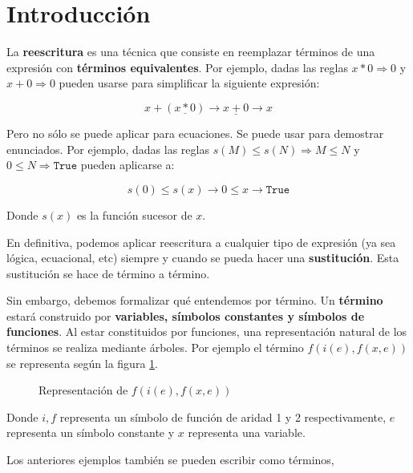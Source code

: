 \chapter*{Introducción}

La \textbf{reescritura} es una técnica que consiste en reemplazar términos de
una expresión con \textbf{términos equivalentes}. Por ejemplo, dadas las reglas
$x * 0 \Rightarrow 0$ y $x + 0 \Rightarrow 0$ pueden usarse para
simplificar la siguiente expresión:

\[
x + (\underline{x*0}) \longrightarrow \underline{x + 0} \longrightarrow x
\]

Pero no sólo se puede aplicar para ecuaciones. Se puede usar para
demostrar enunciados. Por ejemplo, dadas las reglas
$s(M) \leq s(N) \Rightarrow M \leq N$ y
$0 \leq N \Rightarrow \texttt{True}$ pueden aplicarse a:

\[
  s(0) \leq s(x) \longrightarrow 0 \leq x \longrightarrow
  \texttt{True}
\]

Donde $s(x)$ es la función sucesor de $x$.

En definitiva, podemos aplicar reescritura a cualquier tipo de
expresión (ya sea lógica, ecuacional, etc) siempre y cuando se pueda
hacer una \textbf{sustitución}. Esta sustitución se hace de término a término.

Sin embargo, debemos formalizar qué entendemos por término. Un \textbf{término}
estará construido por \textbf{variables, símbolos constantes y símbolos de
funciones}. Al estar constituidos por funciones, una representación
natural de los términos se realiza mediante árboles. Por ejemplo el
término $f(i(e),f(x,e))$ se representa según la figura \ref{fig:0.1}.

\begin{figure}[h]
  \centering
  \caption{Representación de $f(i(e),f(x,e))$}
  \label{fig:0.1}
\end{figure}

Donde $i,f$ representa un símbolo de función de aridad 1 y 2
respectivamente, $e$ representa un símbolo constante y $x$ representa
una variable.

Los anteriores ejemplos también se pueden escribir como términos,

